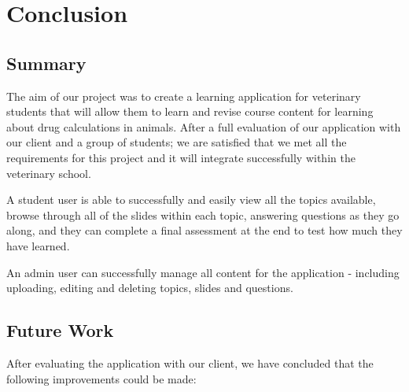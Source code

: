 \documentclass{l3proj}
\begin{document}
\chapter{Conclusion}
\label{conclusion}

\section{Summary}

The aim of our project was to create a learning application for
veterinary students that will allow them to learn and revise course
content for learning about drug calculations in animals. After a full
evaluation of our application with our client and a group of students;
we are satisfied that we met all the requirements for this project and
it will integrate successfully within the veterinary school.

A student user is able to successfully and easily view all the topics available, browse through all of the slides within each topic, answering questions as they go along, and they can complete a final assessment at the end to test how much they have learned.

An admin user can successfully manage all content for the application
- including uploading, editing and deleting topics, slides and questions. 

\section{Future Work}


After evaluating the application with our client, we have concluded that the following improvements could be made:
\end{document}
